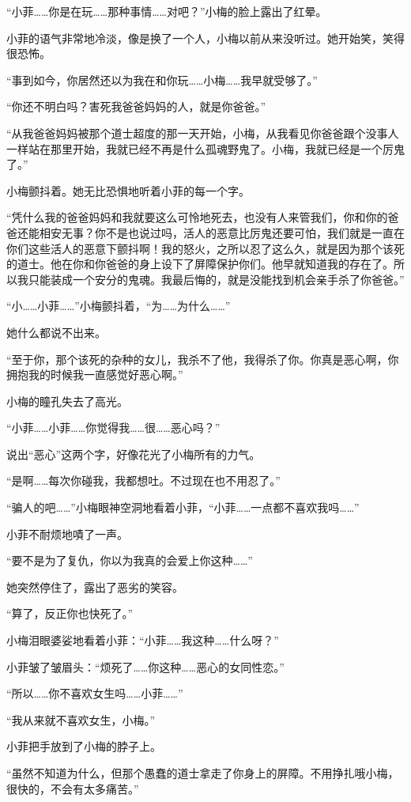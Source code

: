 \documentclass[12pt,a4paper]{ctexart}
\begin{document}
“小菲……你是在玩……那种事情……对吧？”小梅的脸上露出了红晕。

小菲的语气非常地冷淡，像是换了一个人，小梅以前从来没听过。她开始笑，笑得很恐怖。

“事到如今，你居然还以为我在和你玩……小梅……我早就受够了。”

“你还不明白吗？害死我爸爸妈妈的人，就是你爸爸。”

“从我爸爸妈妈被那个道士超度的那一天开始，小梅，从我看见你爸爸跟个没事人一样站在那里开始，我就已经不再是什么孤魂野鬼了。小梅，我就已经是一个厉鬼了。”

小梅颤抖着。她无比恐惧地听着小菲的每一个字。

“凭什么我的爸爸妈妈和我就要这么可怜地死去，也没有人来管我们，你和你的爸爸还能相安无事？你不是也说过吗，活人的恶意比厉鬼还要可怕，我们就是一直在你们这些活人的恶意下颤抖啊！我的怒火，之所以忍了这么久，就是因为那个该死的道士。他在你和你爸爸的身上设下了屏障保护你们。他早就知道我的存在了。所以我只能装成一个安分的鬼魂。我最后悔的，就是没能找到机会亲手杀了你爸爸。”

“小……小菲……”小梅颤抖着，“为……为什么……”

她什么都说不出来。

“至于你，那个该死的杂种的女儿，我杀不了他，我得杀了你。你真是恶心啊，你拥抱我的时候我一直感觉好恶心啊。”

小梅的瞳孔失去了高光。

“小菲……小菲……你觉得我……很……恶心吗？”

说出“恶心”这两个字，好像花光了小梅所有的力气。

“是啊……每次你碰我，我都想吐。不过现在也不用忍了。”

“骗人的吧……”小梅眼神空洞地看着小菲，“小菲……一点都不喜欢我吗……”

小菲不耐烦地嘖了一声。

“要不是为了复仇，你以为我真的会爱上你这种……”

她突然停住了，露出了恶劣的笑容。

“算了，反正你也快死了。”

小梅泪眼婆娑地看着小菲：“小菲……我这种……什么呀？”

小菲皱了皱眉头：“烦死了……你这种……恶心的女同性恋。”

“所以……你不喜欢女生吗……小菲……”

“我从来就不喜欢女生，小梅。”

小菲把手放到了小梅的脖子上。

“虽然不知道为什么，但那个愚蠢的道士拿走了你身上的屏障。不用挣扎哦小梅，很快的，不会有太多痛苦。”
\end{document}
